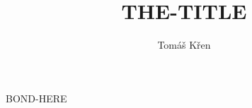 \documentclass[a4paper,oneside]{memoir}
\title{THE-TITLE}
\author{Tomáš Křen}
\begin{document}
\frontmatter
\mainmatter
\maketitle

\renewcommand{\chaptername}{Akt}

\tableofcontents*

BOND-HERE

\backmatter
\end{document}

